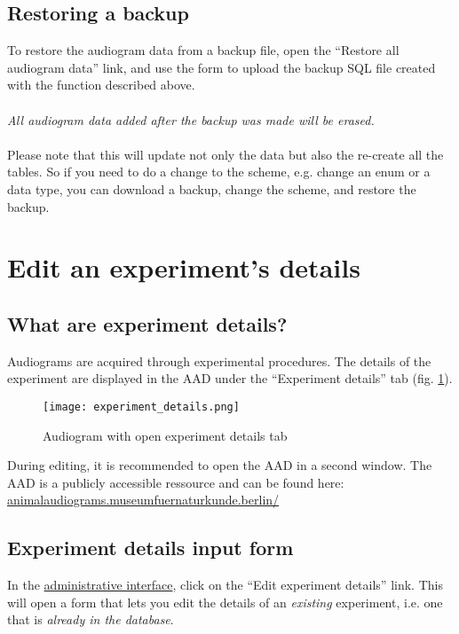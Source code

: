 \documentclass{article}
\begin{document}
\subsection{Restoring a backup}
To restore the audiogram data from a backup file, open the ``Restore all audiogram data'' link, and use the form to upload the backup SQL file created with the function described above.
\\\\
\emph{All audiogram data added after the backup was made will be erased.}
\\\\
Please note that this will update not only the data but also the re-create all the tables. So if you need to do a change to the scheme, e.g. change an enum or a data type, you can download a backup, change the scheme, and restore the backup.

\section{Edit an experiment's details}
\subsection{What are experiment details?}
Audiograms are acquired through experimental procedures. The details of the experiment are displayed in the AAD under the ``Experiment details'' tab (fig. \ref{fig:experiment_details}).

\begin{figure}
\texttt{[image: experiment\_details.png]}
\caption{Audiogram with open experiment details tab}
\label{fig:experiment_details}
\end{figure}

\begin{it}During editing, it is recommended to open the AAD in a second window. The AAD is a publicly accessible ressource and can be found here:\\ \url{animalaudiograms.museumfuernaturkunde.berlin/}
\end{it}

\subsection{Experiment details input form}
In the \href{https://animalaudiograms.museumfuernaturkunde.berlin/admin/v1/start}{administrative interface}, click on the ``Edit experiment details'' link. This will open a form that lets you edit the details of an \emph{existing} experiment, i.e. one that is \emph{already in the database}.
\end{document}
